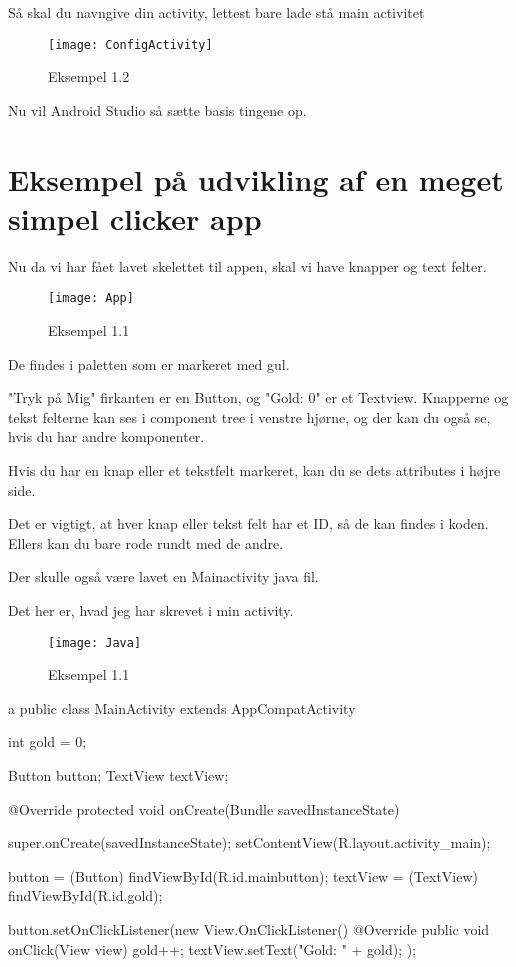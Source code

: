 Så skal du navngive din activity, lettest bare lade stå main activitet 

\begin{figure}[h]
	\texttt{[image: ConfigActivity]}
	\caption{Eksempel 1.2}
	\label{fig:Config Activiy}
\end{figure}

Nu vil Android Studio så sætte basis tingene op.

\FloatBarrier

\section{Eksempel på udvikling af en meget simpel clicker app}

Nu da vi har fået lavet skelettet til appen, skal vi have knapper og text felter.

\begin{figure}[h]
	\texttt{[image: App]}
	\caption{Eksempel 1.1}
	\label{fig:App}
\end{figure}

De findes i paletten som er markeret med gul. 

"Tryk på Mig" firkanten er en Button, og "Gold: 0" er et Textview. 
Knapperne og tekst felterne kan ses i component tree i venstre hjørne, og der kan du også se, hvis du har andre komponenter.

Hvis du har en knap eller et tekstfelt markeret, kan du se dets attributes i højre side.

Det er vigtigt, at hver knap eller tekst felt har et ID, så de kan findes i koden. Ellers kan du bare rode rundt med de andre. 

Der skulle også være lavet en Mainactivity java fil.

Det her er, hvad jeg har skrevet i min activity. 
\begin{figure}[h]
	\texttt{[image: Java]}
	\caption{Eksempel 1.1}
	\label{fig:Java}
\end{figure}

\begin{JavaCode}{2}{a}
	public class MainActivity extends AppCompatActivity {
		int gold = 0;
		
		Button button;
		TextView textView;
		
		@Override
		protected void onCreate(Bundle savedInstanceState) {
			super.onCreate(savedInstanceState);
			setContentView(R.layout.activity_main);
			
			button = (Button) findViewById(R.id.mainbutton);
			textView = (TextView) findViewById(R.id.gold);
			
			button.setOnClickListener(new View.OnClickListener() {
				@Override
				public void onClick(View view) {
					gold++;
					textView.setText("Gold: " + gold);	
				}
			});
		}
	}
\end{JavaCode}

